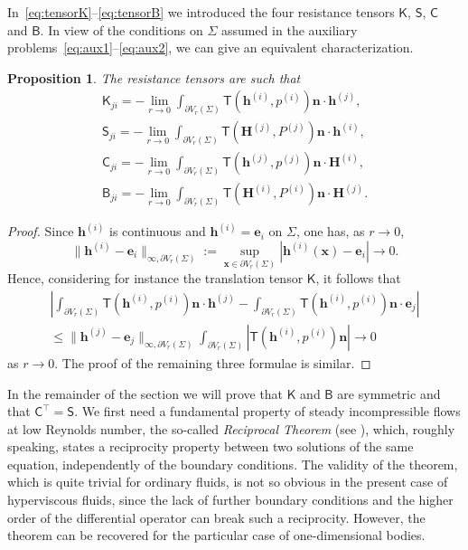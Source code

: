 \documentclass[final]{amsart}
\newtheorem{prop}[thm]{Proposition}
\theoremstyle{definition}
\theoremstyle{definition}
\theoremstyle{remark}
\begin{document}
In~\eqref{eq:tensorK}--\eqref{eq:tensorB} we introduced the four
resistance tensors ${\mathsf K}$, ${\mathsf S}$, ${\mathsf C}$ and ${\mathsf B}$. In view of
the conditions on ${\Sigma}$ assumed in the auxiliary
problems~\eqref{eq:aux1}--\eqref{eq:aux2}, we can give an equivalent
characterization.
\begin{prop}\label{prop:tensors}
The resistance tensors are such that
\begin{gather*}
{\mathsf K}_{ji}=-\lim_{r\to 0}\int_{{\partial} V_r({\Sigma})}{\mathsf T}({\boldsymbol h}^{(i)},p^{(i)}){\boldsymbol n}\cdot{\boldsymbol h}^{(j)},\\
{\mathsf S}_{ji}=-\lim_{r\to 0}\int_{{\partial} V_r({\Sigma})}{\mathsf T}({\boldsymbol H}^{(j)},P^{(j)}){\boldsymbol n}\cdot{\boldsymbol h}^{(i)},\\
{\mathsf C}_{ji}=-\lim_{r\to 0}\int_{{\partial} V_r({\Sigma})}{\mathsf T}({\boldsymbol h}^{(j)},p^{(j)}){\boldsymbol n}\cdot{\boldsymbol H}^{(i)},\\
{\mathsf B}_{ji}=-\lim_{r\to 0}\int_{{\partial} V_r({\Sigma})}{\mathsf T}({\boldsymbol H}^{(i)},P^{(i)}){\boldsymbol n}\cdot{\boldsymbol H}^{(j)}.
\end{gather*}
\end{prop}

\begin{proof}
Since ${\boldsymbol h}^{(i)}$ is continuous and ${\boldsymbol h}^{(i)}={\boldsymbol e}_i$ on ${\Sigma}$,
one has, as $r\to 0$,
\[
\|{\boldsymbol h}^{(i)}-{\boldsymbol e}_i\|_{\infty,{\partial} V_r({\Sigma})}:=\sup_{{\boldsymbol x} \in{\partial}
  V_r({\Sigma})}|{\boldsymbol h}^{(i)}({\boldsymbol x})-{\boldsymbol e}_i|\to 0.
\]
Hence, considering for instance the translation tensor ${\mathsf K}$, it
follows that
\begin{multline*}
\left|\int_{{\partial} V_r({\Sigma})}{\mathsf T}({\boldsymbol h}^{(i)},p^{(i)}){\boldsymbol n}\cdot{\boldsymbol h}^{(j)}-
\int_{{\partial} V_r({\Sigma})}{\mathsf T}({\boldsymbol h}^{(i)},p^{(i)}){\boldsymbol n}\cdot{\boldsymbol e}_j\right|\\
\leq \|{\boldsymbol h}^{(j)}-{\boldsymbol e}_j\|_{\infty,{\partial} V_r({\Sigma})}
\int_{{\partial} V_r({\Sigma})}\left|{\mathsf T}({\boldsymbol h}^{(i)},p^{(i)}){\boldsymbol n}\right|\to 0
\end{multline*}
as $r\to 0$. The proof of the remaining three formulae is similar.
\end{proof}

In the remainder of the section we will prove that ${\mathsf K}$ and ${\mathsf B}$
are symmetric and that ${\mathsf C}^{\intercal}={\mathsf S}$. We first need a fundamental
property of steady incompressible flows at low Reynolds number, the
so-called {\em Reciprocal Theorem} (see \cite[Sec.\ 3-5]{HapBre65}),
which, roughly speaking, states a reciprocity property between two
solutions of the same equation, independently of the boundary
conditions. The validity of the theorem, which is quite trivial for
ordinary fluids, is not so obvious in the present case of hyperviscous
fluids, since the lack of further boundary conditions and the higher order
of the differential operator can break such a reciprocity. However, the
theorem can be recovered for the particular case of one-dimensional
bodies.
\end{document}
